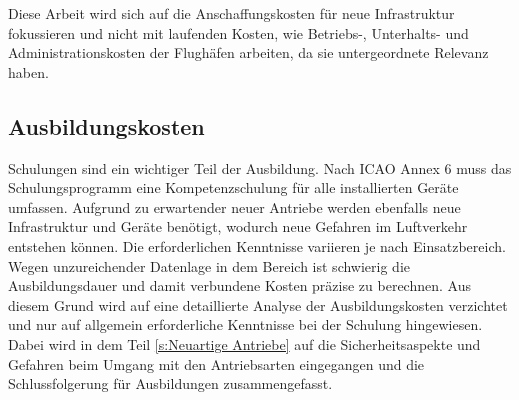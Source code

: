 Diese Arbeit wird sich auf die Anschaffungskosten für neue Infrastruktur fokussieren und nicht mit 
laufenden Kosten, wie Betriebs-, Unterhalts- und Administrationskosten der Flughäfen arbeiten, 
da sie untergeordnete Relevanz haben.

\subsection{Ausbildungskosten}
%
Schulungen sind ein wichtiger Teil der Ausbildung. 
Nach ICAO Annex 6 muss das Schulungsprogramm eine Kompetenzschulung für alle installierten Geräte umfassen.
Aufgrund zu erwartender neuer Antriebe werden ebenfalls neue Infrastruktur und Geräte benötigt, 
wodurch neue Gefahren im Luftverkehr entstehen können. %
Die erforderlichen Kenntnisse variieren je nach Einsatzbereich.
%
Wegen unzureichender Datenlage in dem Bereich ist schwierig die 
Ausbildungsdauer und damit verbundene Kosten präzise zu berechnen.
Aus diesem Grund wird auf eine detaillierte Analyse der Ausbildungskosten verzichtet 
und nur auf allgemein erforderliche Kenntnisse bei der Schulung hingewiesen.
Dabei wird in dem Teil \ref{s:Neuartige Antriebe} auf die Sicherheitsaspekte und Gefahren 
beim Umgang mit den Antriebsarten eingegangen und %
die Schlussfolgerung für Ausbildungen zusammengefasst. %


